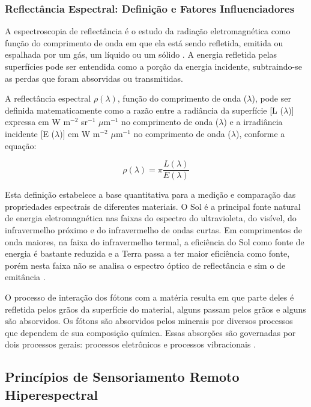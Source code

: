 \subsubsection{Reflectância Espectral: Definição e Fatores Influenciadores}

A espectroscopia de reflectância é o estudo da radiação eletromagnética 
como função do comprimento de onda em que ela está sendo refletida, emitida 
ou espalhada por um gás, um líquido ou um sólido \cite{Baptista2019}. 
A energia refletida pelas superfícies pode ser entendida como a porção da 
energia incidente, subtraindo-se as perdas que foram absorvidas ou 
transmitidas.

A reflectância espectral $\rho(\lambda)$, função do comprimento de onda 
($\lambda$), pode ser definida matematicamente como a razão entre a 
radiância da superfície [L ($\lambda$)] expressa em W m$^{-2}$ sr$^{-1}$ 
$\mu$m$^{-1}$ no comprimento de onda ($\lambda$) e a irradiância incidente 
[E ($\lambda$)] em W m$^{-2}$ $\mu$m$^{-1}$ no comprimento de onda 
($\lambda$), conforme a equação:

\begin{equation}
\rho(\lambda) = \pi \frac{L(\lambda)}{E(\lambda)}
\end{equation}

Esta definição estabelece a base quantitativa para a medição e comparação 
das propriedades espectrais de diferentes materiais. 
O Sol é a principal fonte natural de energia eletromagnética nas faixas do 
espectro do ultravioleta, do visível, do infravermelho próximo e do 
infravermelho de ondas curtas. Em comprimentos de onda maiores, na faixa do 
infravermelho termal, a eficiência do Sol como fonte de energia é bastante 
reduzida e a Terra passa a ter maior eficiência como fonte, porém nesta 
faixa não se analisa o espectro óptico de reflectância e sim o de
emitância \cite{Baptista2019}.

O processo de interação dos fótons com a matéria resulta em que parte deles 
é refletida pelos grãos da superfície do material, alguns passam pelos 
grãos e alguns são absorvidos. Os fótons são 
absorvidos pelos minerais por diversos processos que dependem de sua 
composição química. Essas absorções são governadas por dois processos 
gerais: processos eletrônicos e processos vibracionais \cite{Baptista2019}.

\subsection{Princípios de Sensoriamento Remoto Hiperespectral}
\label{subsec:principios_sensoriamento}

